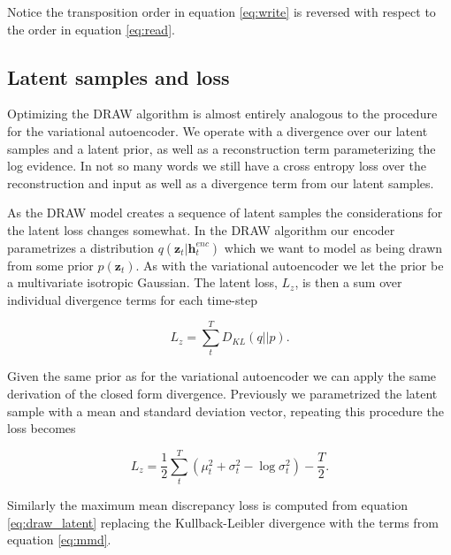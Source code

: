 \noindent Notice the transposition order in equation \ref{eq:write} is reversed with respect to the order in equation \ref{eq:read}. 

\subsection{Latent samples and loss}

Optimizing the DRAW algorithm is almost entirely analogous to the procedure for the variational autoencoder. We operate with a divergence over our latent samples and a latent prior, as well as a reconstruction term parameterizing the log evidence. In not so many words we still have a cross entropy loss over the reconstruction and input as well as a divergence term from our latent samples.  

As the DRAW model creates a sequence of latent samples the considerations for the latent loss changes somewhat. In the DRAW algorithm our encoder parametrizes a distribution $q(\mathbf{z}_t | \mathbf{h}_t^{enc})$ which we want to model as being drawn from some prior $p(\mathbf{z}_t)$. As with the variational autoencoder we let the prior be a multivariate isotropic Gaussian. The latent loss, $L_z$, is then a sum over individual divergence terms for each time-step

\begin{equation}\label{eq:draw_latent}
L_z = \sum_t^T D_{KL}(q||p).
\end{equation}

\noindent Given the same prior as for the variational autoencoder we can apply the same derivation of the closed form divergence. Previously we parametrized the latent sample with a mean and standard deviation vector, repeating this procedure the loss becomes 

\begin{equation}\label{eq:draw_kl}
L_z = \frac{1}{2}\sum_t^T(\mu^2_t + \sigma^2_t - \log \sigma_t ^2) - \frac{T}{2}.
\end{equation}

\noindent Similarly the maximum mean discrepancy loss is computed from equation \ref{eq:draw_latent} replacing the Kullback-Leibler divergence with the terms from equation \ref{eq:mmd}.
